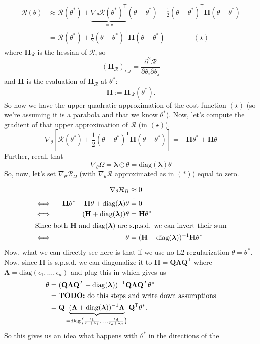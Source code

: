 \documentclass[a2paper,8pt]{extarticle}
\newcommand{\cR}{\mathcal{R}}
\newcommand*{\T}{\mathsf{T}}
\newcommand{\diag}{\text{diag}}
\newcommand{\mbeq}{\stackrel{!}{=}}
\newcommand{\mat}[1]{\mathbf{#1}}
\renewcommand{\vec}[1]{\mathbf{#1}}
\newcommand{\vo}{\vec{o}}
\newcommand{\vlambda}{\boldsymbol{\lambda}}
\newcommand{\MH}{\mat{H}}
\newcommand{\MQ}{\mat{Q}}
\newcommand{\MLambda}{\mat{\Lambda}}
\newcommand{\todo}[1]{\textbf{TODO:} #1}
\newcommand{\todo}[1]{%
}
\begin{document}
\begin{landscape}
\begin{multicols*}{7}
\begin{align*}
\cR(\theta)
&\approx
\cR(\theta^*)
+
\underbrace{\nabla_{\theta}\cR(\theta^*)^\T}_{=\vo}(\theta-\theta^*)
+
\frac{1}{2}(\theta-\theta^*)^\T\MH(\theta-\theta^*)
\\
&=\cR(\theta^*)
+
\frac{1}{2}(\theta-\theta^*)^\T\MH(\theta-\theta^*)
\qquad\qquad(\star)
\end{align*}
where $\MH_{\cR}$ is the hessian of $\cR$, so
\[
(\MH_{\cR})_{i,j}
=
\frac{\partial^2 \cR}{\partial \theta_i \partial \theta_j}
\]
and $\MH$ is the evaluation of $\MH_{\cR}$ at $\theta^*$:
\[
\MH := \MH_{\cR}(\theta^*).
\]
So now we have the upper quadratic approximation of the cost function
$(\star)$ (so we're assuming it is a parabola and that we know $\theta^*$). Now,
let's compute the gradient of that upper approximation of $\cR$ (in $(\star)$).
\[
\nabla_{\theta}\left[
\cR(\theta^*)
+
\frac{1}{2}(\theta-\theta^*)^\T\MH(\theta-\theta^*)
\right]
=
-\MH\theta^* +\MH\theta
\tag{*}
\]
Further, recall that
\[
\nabla_{\theta}\Omega
=
\vlambda\odot\theta
=
\diag(\vlambda)\theta
\]
So, now, let's set $\nabla_{\theta}\cR_{\Omega}$ (with $\nabla_{\theta}\cR$ 
approximated as in $(*)$) equal to zero.
\begin{align*}
&&
\nabla_{\theta}\cR_{\Omega}
&\stackrel{!}{\approx} 
0
\\
&\Longleftrightarrow&
-\MH\theta^*+\MH\theta
+\diag(\vlambda)\theta
&\mbeq 0
\\
&\Longleftrightarrow&
(\MH +\diag(\vlambda))\theta
&=
\MH\theta^*
\\
\shortintertext{Since both $\MH$ and $\diag(\vlambda)$ are s.p.s.d. we can
invert their sum} 
&\Longleftrightarrow&
\theta
&=
(\MH +\diag(\vlambda))^{-1}
\MH\theta^*
\end{align*}
Now, what we can directly see here is that if we use no L2-regularization
$\theta=\theta^*$. Now, since $\MH$ is s.p.s.d. we can diagonalize it to
$\MH=\MQ\MLambda\MQ^\T$ where $\MLambda=\diag(\epsilon_1,\ldots,\epsilon_d)$ and
plug this in which gives us
\begin{align*}
\theta
&=
(\MQ\MLambda\MQ^T +\diag(\vlambda))^{-1}
\MQ\MLambda\MQ^T\theta^*
\\
&=\text{\todo{do this steps and write down assumptions}}
\\
&=\MQ\underbrace{(\MLambda+\diag(\vlambda))^{-1}\MLambda}_{
=\diag\left(
\frac{\epsilon_1}{\epsilon_1+\lambda_1},
\ldots, 
\frac{\epsilon_d}{\epsilon_d+\lambda_d}\right)
}\MQ^\T\theta^*.
\end{align*}
So this gives us an idea what happens with $\theta^*$ in the directions of the

\end{multicols*}
\end{landscape}
\end{document}
